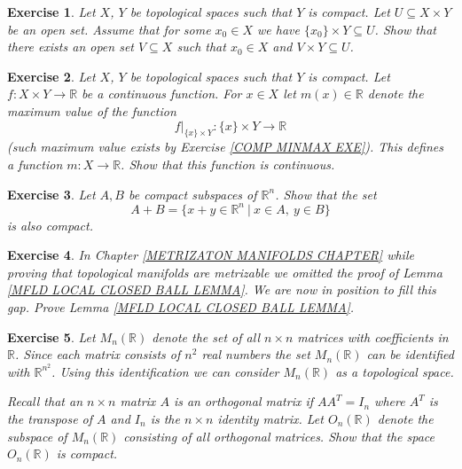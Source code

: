 \documentclass[11pt, letterpaper, oneside]{report}
\theoremstyle{pplain}
\newtheorem{ITERMVALUE THM}[theorem]{Intermediate Value Theorem}
\newtheorem{HEINEBOREL THM}[theorem]{Heine-Borel Theorem}
\newtheorem{UMETR THM}[theorem]{Urysohn Metrization Theorem}
\newtheorem{UMETR2 THM}[theorem]{Urysohn Metrization Theorem (v.2)}
\theoremstyle{ddefinition}
\theoremstyle{nnn}
\newtheorem{TDA NN}[theorem]{Topological Data Analysis. }
\theoremstyle{eexercise}
\newtheorem{exercise}{Exercise}[chapter]
\newcommand{\R}{{\mathbb R}}
\begin{document}
\begin{exercise}
\label{TUBE EXE}
Let $X$, $Y$ be topological spaces such that $Y$ is compact. Let $U\subseteq X\times Y$ be 
an open set. Assume that for some $x_{0}\in X$ we have $\{x_{0}\}\times Y \subseteq U$. Show 
that there exists an open set $V\subseteq X$ such that $x_{0}\in X$ and $V\times Y \subseteq U$.   
\end{exercise}




\begin{exercise}
Let $X$, $Y$ be topological spaces such that $Y$ is compact. Let $f\colon X\times Y \to \R$ be
a continuous function. For $x\in X$ let $m(x)\in \R$ denote the maximum value of the function
$$f|_{\{x\}\times Y}\colon \{x\}\times Y \to \R$$  
(such maximum value exists by Exercise \ref{COMP MINMAX EXE}). This defines a function 
$m\colon X \to \R$. Show that this function is continuous. 
\end{exercise}





\begin{exercise}
Let $A, B$ be compact subspaces of $\R^{n}$. Show that the set
$$A+B = \{ x+y\in \R^{n} \ | \ x\in A, \ y\in B \}$$
is also compact. 
\end{exercise}



%
%
%

\begin{exercise}
\label{MFLD LOCAL CLOSED BALL EXERCISE}
In Chapter \ref{METRIZATON MANIFOLDS CHAPTER} while proving that topological 
manifolds are metrizable we omitted the proof of Lemma 
\ref{MFLD LOCAL CLOSED BALL LEMMA}. We are now in position to fill this gap. 
Prove Lemma \ref{MFLD LOCAL CLOSED BALL LEMMA}. 
\end{exercise}





\begin{exercise}
Let $M_{n}(\R)$ denote the set of all $n\times n$ matrices with coefficients in $\R$. Since 
each matrix consists of $n^{2}$ real numbers the set $M_{n}(\R)$ can be identified with $\R^{n^{2}}$.
Using this identification we can consider $M_{n}(\R)$ as a topological space. 


Recall that an $n\times n$ matrix $A$ is an orthogonal matrix if $AA^{T} = I_{n}$ where 
$A^{T}$ is the transpose of $A$ and $I_{n}$ is the $n\times n$ identity matrix. Let 
$O_{n}(\R)$ denote the subspace of $M_{n}(\R)$ consisting of all orthogonal matrices. 
Show that the space $O_{n}(\R)$  is compact. 
\end{exercise}
\end{document}
